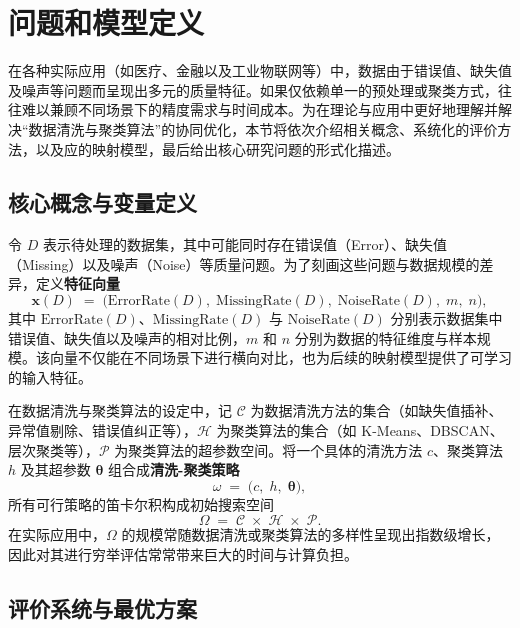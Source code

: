 \documentclass[10pt]{article} %
\numberwithin{equation}{section}
\begin{document}
\section{问题和模型定义}
\label{sec:problem-and-model}

在各种实际应用（如医疗、金融以及工业物联网等）中，数据由于错误值、缺失值及噪声等问题而呈现出多元的质量特征。如果仅依赖单一的预处理或聚类方式，往往难以兼顾不同场景下的精度需求与时间成本。为在理论与应用中更好地理解并解决“数据清洗与聚类算法”的协同优化，本节将依次介绍相关概念、系统化的评价方法，以及应的映射模型，最后给出核心研究问题的形式化描述。

\subsection{核心概念与变量定义}
\label{subsec:core-concepts}

令 \(D\) 表示待处理的数据集，其中可能同时存在错误值（Error）、缺失值（Missing）以及噪声（Noise）等质量问题。为了刻画这些问题与数据规模的差异，定义\textbf{特征向量}
\begin{equation}\label{eq:xD}
  \mathbf{x}(D) 
  \;=\; 
  \bigl(\mathrm{ErrorRate}(D),\; \mathrm{MissingRate}(D),\; \mathrm{NoiseRate}(D),\; m,\; n\bigr),
\end{equation}
其中 \(\mathrm{ErrorRate}(D)\)、\(\mathrm{MissingRate}(D)\) 与 \(\mathrm{NoiseRate}(D)\) 分别表示数据集中错误值、缺失值以及噪声的相对比例，\(m\) 和 \(n\) 分别为数据的特征维度与样本规模。该向量不仅能在不同场景下进行横向对比，也为后续的映射模型提供了可学习的输入特征。

在数据清洗与聚类算法的设定中，记 \(\mathcal{C}\) 为数据清洗方法的集合（如缺失值插补、异常值剔除、错误值纠正等），\(\mathcal{H}\) 为聚类算法的集合（如 K-Means、DBSCAN、层次聚类等），\(\mathcal{P}\) 为聚类算法的超参数空间。将一个具体的清洗方法 \(c\)、聚类算法 \(h\) 及其超参数 \(\boldsymbol{\theta}\) 组合成\textbf{清洗-聚类策略}
\begin{equation}\label{eq:omega}
  \omega 
  \;=\; 
  \bigl(c,\; h,\; \boldsymbol{\theta}\bigr),
\end{equation}
所有可行策略的笛卡尔积构成初始搜索空间
\begin{equation}\label{eq:Omega}
  \Omega 
  \;=\; 
  \mathcal{C} \;\times\; \mathcal{H} \;\times\; \mathcal{P}.
\end{equation}
在实际应用中，\(\Omega\) 的规模常随数据清洗或聚类算法的多样性呈现出指数级增长，因此对其进行穷举评估常常带来巨大的时间与计算负担。

\subsection{评价系统与最优方案}
\label{subsec:evaluation-system}
\end{document}
